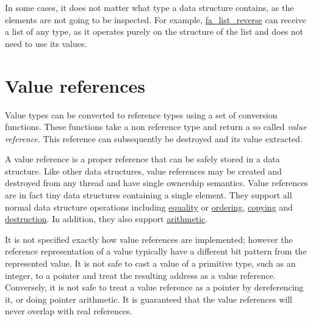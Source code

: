 In some cases, it does not matter what type a data structure contains, as the elements are not going to be inspected. For example, \hyperlink{group___fa_list_ga7b187ef70819a17992b0d787683de241}{fa\-\_\-list\-\_\-reverse} can receive a list of any type, as it operates purely on the structure of the list and does not need to use its values.\hypertarget{md__data_structures_id182783728273}{}\section{Value references}\label{md__data_structures_id182783728273}
\label{md__data_structures_ValueReferences}%
\hypertarget{md__data_structures_ValueReferences}{}%
 Value types can be converted to reference types using a set of conversion functions. These functions take a non reference type and return a so called {\itshape value reference}. This reference can subsequently be destroyed and its value extracted.

A value reference is a proper reference that can be safely stored in a data structure. Like other data structures, value references may be created and destroyed from any thread and have single ownership semantics. Value references are in fact tiny data structures containing a single element. They support all normal data structure operations including \hyperlink{structfa__equal__t}{equality} or \hyperlink{structfa__order__t}{ordering}, \hyperlink{structfa__copy__t}{copying} and \hyperlink{structfa__destroy__t}{destruction}. In addition, they also support \hyperlink{structfa__number__t}{arithmetic}.

It is not specified exactly how value references are implemented; however the reference representation of a value typically have a different bit pattern from the represented value. It is not safe to cast a value of a primitive type, such as an integer, to a pointer and treat the resulting address as a value reference. Conversely, it is not safe to treat a value reference as a pointer by dereferencing it, or doing pointer arithmetic. It is guaranteed that the value references will never overlap with real references. 